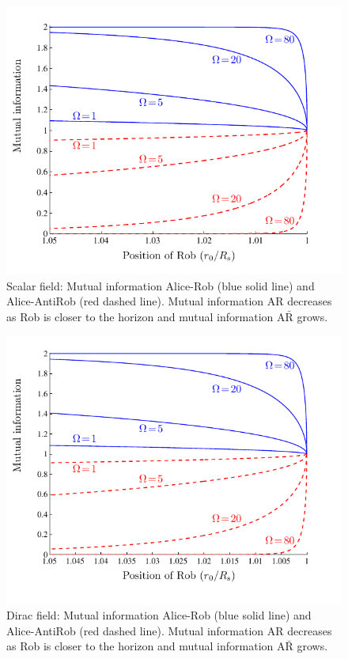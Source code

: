 \begin{figure}[h]
\begin{center}
\includegraphics[width=.85\textwidth]{conservabos}
\caption{Scalar field: Mutual information Alice-Rob (blue solid line) and
Alice-AntiRob (red dashed line).  Mutual information  AR
decreases as Rob is closer to the horizon and mutual information
$\text{A}\bar{\text{R}}$ grows.}
\label{smi}
\end{center}
\end{figure}

\begin{figure}[h]
\begin{center}
\includegraphics[width=.85\textwidth]{muinfer}
\caption{Dirac field: Mutual information Alice-Rob (blue solid line) and
Alice-AntiRob (red dashed line).  Mutual information  AR
 decreases as Rob is closer to the horizon and mutual information $\text{A}\bar{\text{R}}$
  grows.}
\label{dmi}
\end{center}
\end{figure}


